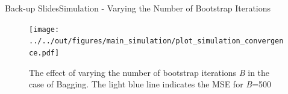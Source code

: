 \documentclass{beamer}
\begin{document}
\begin{frame}{Back-up Slides}{Simulation - Varying the Number of Bootstrap Iterations}
\begin{center}
\begin{figure}


\texttt{[image: ../../out/figures/main\_simulation/plot\_simulation\_convergence.pdf]}
\caption{The effect of varying the number of bootstrap iterations \textit{B} in the case of Bagging. The light blue line indicates the MSE for \textit{B}=500}
\end{figure}
\end{center}
\end{frame}








\end{document}
